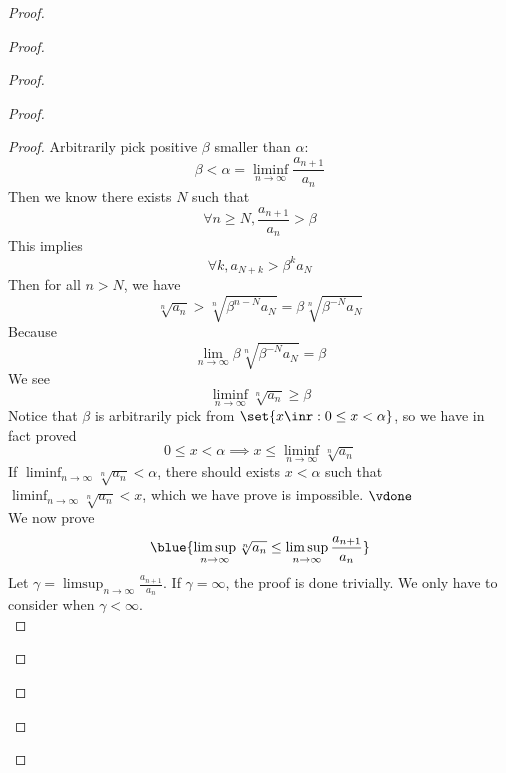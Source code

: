 \documentclass{report}
\begin{document}
\begin{proof}
\begin{proof}
\begin{proof}
\begin{proof}
\begin{proof}
Arbitrarily pick positive $\beta $ smaller than $\alpha $:
\begin{equation*}
\beta <\alpha=\liminf_{n\to\infty} \frac{a_{n+1}}{a_n}
\end{equation*}
Then we know there exists $N$ such that
 \begin{equation*}
\forall n\geq N, \frac{a_{n+1}}{a_n}>\beta 
\end{equation*}
This implies 
\begin{equation*}
\forall k, a_{N+k}>\beta^k a_N
\end{equation*}
Then for all $n>N$, we have
 \begin{equation*}
   \sqrt[n]{a_n}>\sqrt[n]{ \beta^{n-N}a_{N}}=\beta \sqrt[n]{\beta^{-N}a_N} 
\end{equation*}
Because 
\begin{equation*}
\lim_{n\to\infty}\beta \sqrt[n]{\beta^{-N}a_N}=\beta 
\end{equation*}
We see
\begin{equation*}
\liminf_{n\to\infty} \sqrt[n]{a_n} \geq \beta 
\end{equation*} 
Notice that $\beta $ is arbitrarily pick from $\set{x\inr: 0\leq x<\alpha }$, so we have in fact proved
\begin{equation*}
0\leq x<\alpha \implies x\leq \liminf_{n\to\infty} \sqrt[n]{a_n} 
\end{equation*}
If $\liminf_{n\to\infty} \sqrt[n]{a_n} <\alpha $, there should exists $x<\alpha $ such that $\liminf_{n\to\infty} \sqrt[n]{a_n} <x$, which we have prove is impossible. $\vdone$\\

We now prove 
\begin{equation*}
\blue{\limsup_{n\to\infty} \sqrt[n]{a_n}\leq \limsup_{n\to\infty} \frac{a_{n+1}}{a_n}}
\end{equation*}
Let $\gamma =\limsup_{n\to\infty} \frac{a_{n+1}}{a_n}$.  If $\gamma =\infty$, the proof is done trivially. We only have to consider when $\gamma<\infty$.\\


\end{proof}
\end{proof}
\end{proof}
\end{proof}
\end{proof}
\end{document}

